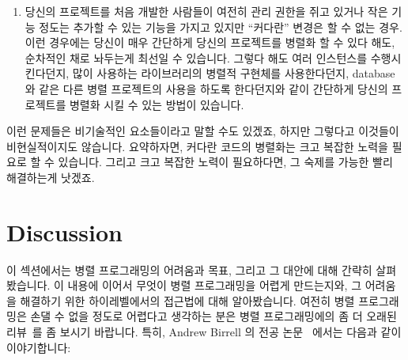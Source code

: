 {\begin{enumerate}
	\item	당신의 프로젝트를 처음 개발한 사람들이 여전히 관리 권한을 쥐고
		있거나 작은 기능 정도는 추가할 수 있는 기능을 가지고 있지만
		``커다란'' 변경은 할 수 없는 경우.
		이런 경우에는 당신이 매우 간단하게 당신의 프로젝트를 병렬화 할
		수 있다 해도, 순차적인 채로 놔두는게 최선일 수 있습니다.
		그렇다 해도 여러 인스턴스를 수행시킨다던지, 많이 사용하는
		라이브러리의 병렬적 구현체를 사용한다던지, database 와 같은
		다른 병렬 프로젝트의 사용을 하도록 한다던지와 같이 간단하게
		당신의 프로젝트를 병렬화 시킬 수 있는 방법이 있습니다.

	\end{enumerate}

	이런 문제들은 비기술적인 요소들이라고 말할 수도 있겠죠, 하지만 그렇다고
	이것들이 비현실적이지도 않습니다.
	요약하자면, 커다란 코드의 병렬화는 크고 복잡한 노력을 필요로 할 수
	있습니다.
	그리고 크고 복잡한 노력이 필요하다면, 그 숙제를 가능한 빨리 해결하는게
	낫겠죠.

} \QuickQuizEnd

\section{Discussion}
\label{sec:intro:Discussion}

이 섹션에서는 병렬 프로그래밍의 어려움과 목표, 그리고 그 대안에 대해 간략히
살펴봤습니다.
이 내용에 이어서 무엇이 병렬 프로그래밍을 어렵게 만드는지와, 그 어려움을
해결하기 위한 하이레벨에서의 접근법에 대해 알아봤습니다.
여전히 병렬 프로그래밍은 손댈 수 없을 정도로 어렵다고 생각하는 분은 병렬
프로그래밍에의 좀 더 오래된
리뷰~\cite{SQNTParallel,AndrewDBirrell1989Threads,Beck85,Inman85}를 좀 보시기
바랍니다.
특히, Andrew Birrell 의 전공 논문~\cite{AndrewDBirrell1989Threads} 에서는
다음과 같이 이야기합니다:

